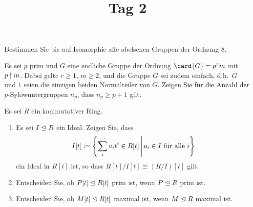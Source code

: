 \documentclass[a4paper, 10pt]{scrartcl}
\title{Tag 2}
\author{}
\date{}
\begin{document}
\begin{question}
  Bestimmen Sie bis auf Isomorphie alle abelschen Gruppen der Ordnung $8$.
\end{question}

\begin{question}
  Es sei $p$ prim und $G$ eine endliche Gruppe der Ordnung $\card{G} = p^r m$ mit $p \mathrel{\nmid} m$.
  Dabei gelte $r \geq 1$, $m \geq 2$, und die Gruppe $G$ sei zudem einfach, d.h.\ $G$ und $1$ seien die einzigen beiden Normalteiler von $G$.
  Zeigen Sie für die Anzahl der $p$-Sylowuntergruppen $n_p$, dass $n_p \geq p + 1$ gilt.
\end{question}

\begin{question}
  Es sei $R$ ein kommutativer Ring.
  \begin{enumerate}
    \item
      Es sei $I \mathrel{\trianglelefteq} R$ ein Ideal.
      Zeigen Sie, dass
      \[
                  I[t]
        \defined  \left\{
                    \sum_i a_i t^i \in R[t]
                  \suchthat*
                    \text{$a_i \in I$ für alle $i$}
                  \right\}
      \]
      ein Ideal in $R[t]$ ist, so dass $R[t]/I[t] \cong (R/I)[t]$ gilt.
    \item
      Entscheiden Sie, ob $P[t] \mathrel{\trianglelefteq} R[t]$ prim ist, wenn $P \mathrel{\trianglelefteq} R$ prim ist.
    \item
      Entscheiden Sie, ob $M[t] \mathrel{\trianglelefteq} R[t]$ maximal ist, wenn $M \mathrel{\trianglelefteq} R$ maximal ist.
  \end{enumerate}
\end{question}
\end{document}
